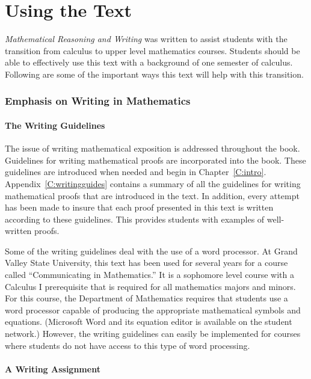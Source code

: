 \part{Using the Text}
\label{part:usingtext}%



\emph{Mathematical Reasoning and Writing} was written to assist students with the transition from calculus to upper level mathematics courses.  Students should be able to effectively use this text with a background of one semester of calculus.  Following are some of the important ways this text will help with this transition.

\section*{Emphasis on Writing in Mathematics}

\subsection*{The Writing Guidelines}

The issue of writing mathematical exposition is addressed throughout the book.  Guidelines for writing mathematical proofs are incorporated into the book.  These guidelines are introduced when needed and begin in Chapter~\ref{C:intro}.  Appendix~\ref{C:writingguides} contains a summary of all the guidelines for writing mathematical proofs that are introduced in the text.  In addition, every attempt has been made to insure that each proof presented in this text is written according to these guidelines.  This provides students with examples of well-written proofs.

\vskip6pt
Some of the writing guidelines deal with the use of a word processor.  At Grand Valley State University, this text has been used for several years for a course called ``Communicating in Mathematics.''  It is a sophomore level course with a Calculus I prerequisite that is required for all mathematics majors and minors.  For this course, the Department of Mathematics requires that students use a word processor capable of producing the appropriate mathematical symbols and equations.  (Microsoft Word and its equation editor is available on the student network.)  However, the writing guidelines can easily be implemented for courses where students do not have access to this type of word processing.

\subsection*{A Writing Assignment}


